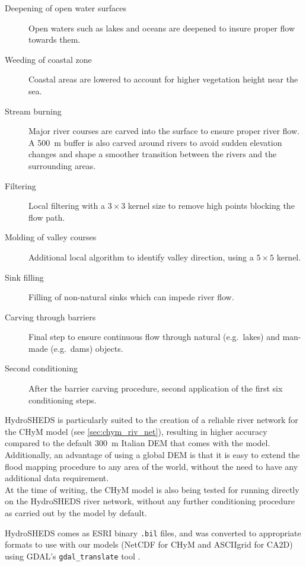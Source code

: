 \begin{description}
    \item[Deepening of open water surfaces] Open waters such as lakes and oceans are deepened to insure proper flow towards them.
    \item[Weeding of coastal zone] Coastal areas are lowered to account for higher vegetation  height near the sea.
    \item[Stream burning] Major river courses are carved into the surface to ensure proper river flow. A \SI{500}{\metre} buffer is also carved around rivers to avoid sudden elevation changes and shape a smoother transition between the rivers and the surrounding areas.
    \item[Filtering] Local filtering with a $3 \times 3$ kernel size to remove high points blocking the flow path.
    \item[Molding of valley courses] Additional local algorithm to identify valley direction, using a $5 \times 5$ kernel.
    \item[Sink filling] Filling of non-natural sinks  which can impede river flow.
    \item[Carving through barriers] Final step to ensure continuous flow through natural (e.g.\ lakes) and man-made (e.g.\ dams) objects.
    \item[Second conditioning] After the barrier carving procedure, second application of the first six conditioning steps.
\end{description}

HydroSHEDS is particularly suited to the creation of a reliable river network for the CHyM model (see \cref{sec:chym_riv_net}), resulting in higher accuracy compared to the default \SI{300}{\metre} Italian DEM that comes with the model. Additionally, an advantage of using a global DEM is that it is easy to extend the flood mapping procedure to any area of the world, without the need to have any additional data requirement.\\
At the time of writing, the CHyM model is also being tested for running directly on the HydroSHEDS river network, without any further conditioning procedure as carried out by the model by default.

HydroSHEDS comes as ESRI binary \texttt{.bil} files, and was converted to appropriate formats to use with our models (NetCDF for CHyM and ASCIIgrid for CA2D) using GDAL's \texttt{gdal\_translate} tool \citep{GDAL}.


